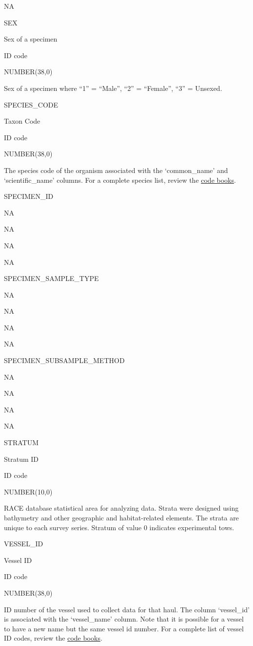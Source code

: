 \documentclass[
  letterpaper,
  oneside,
  open=any]{scrbook}
\begin{document}
NA

SEX

Sex of a specimen

ID code

NUMBER(38,0)

Sex of a specimen where ``1'' = ``Male'', ``2'' = ``Female'', ``3'' =
Unsexed.

SPECIES\_CODE

Taxon Code

ID code

NUMBER(38,0)

The species code of the organism associated with the `common\_name' and
`scientific\_name' columns. For a complete species list, review the
\href{https://www.fisheries.noaa.gov/resource/document/groundfish-survey-species-code-manual-and-data-codes-manual}{code
books}.

SPECIMEN\_ID

NA

NA

NA

NA

SPECIMEN\_SAMPLE\_TYPE

NA

NA

NA

NA

SPECIMEN\_SUBSAMPLE\_METHOD

NA

NA

NA

NA

STRATUM

Stratum ID

ID code

NUMBER(10,0)

RACE database statistical area for analyzing data. Strata were designed
using bathymetry and other geographic and habitat-related elements. The
strata are unique to each survey series. Stratum of value 0 indicates
experimental tows.

VESSEL\_ID

Vessel ID

ID code

NUMBER(38,0)

ID number of the vessel used to collect data for that haul. The column
`vessel\_id' is associated with the `vessel\_name' column. Note that it
is possible for a vessel to have a new name but the same vessel id
number. For a complete list of vessel ID codes, review the
\href{https://www.fisheries.noaa.gov/resource/document/groundfish-survey-species-code-manual-and-data-codes-manual}{code
books}.
\end{document}
